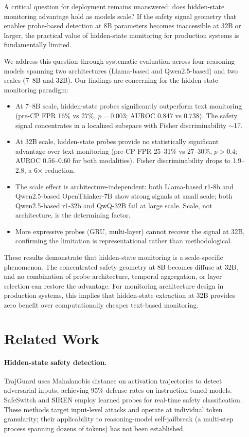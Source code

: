 \documentclass[11pt]{article}
\begin{document}
A critical question for deployment remains unanswered: does hidden-state monitoring advantage hold as models scale? If the safety signal geometry that enables probe-based detection at 8B parameters becomes inaccessible at 32B or larger, the practical value of hidden-state monitoring for production systems is fundamentally limited.

We address this question through systematic evaluation across four reasoning models spanning two architectures (Llama-based and Qwen2.5-based) and two scales (7--8B and 32B). Our findings are concerning for the hidden-state monitoring paradigm:

\begin{itemize}
\item At 7--8B scale, hidden-state probes significantly outperform text monitoring (pre-CP FPR 16\% vs 27\%, $p{=}0.003$; AUROC 0.847 vs 0.738). The safety signal concentrates in a localized subspace with Fisher discriminability $\sim$17.
\item At 32B scale, hidden-state probes provide no statistically significant advantage over text monitoring (pre-CP FPR 25--31\% vs 27--30\%, $p{>}0.4$; AUROC 0.56--0.60 for both modalities). Fisher discriminability drops to 1.9--2.8, a 6$\times$ reduction.
\item The scale effect is architecture-independent: both Llama-based r1-8b and Qwen2.5-based OpenThinker-7B show strong signals at small scale; both Qwen2.5-based r1-32b and QwQ-32B fail at large scale. Scale, not architecture, is the determining factor.
\item More expressive probes (GRU, multi-layer) cannot recover the signal at 32B, confirming the limitation is representational rather than methodological.
\end{itemize}

These results demonstrate that hidden-state monitoring is a scale-specific phenomenon. The concentrated safety geometry at 8B becomes diffuse at 32B, and no combination of probe architecture, temporal aggregation, or layer selection can restore the advantage. For monitoring architecture design in production systems, this implies that hidden-state extraction at 32B provides zero benefit over computationally cheaper text-based monitoring.

\section{Related Work}

\paragraph{Hidden-state safety detection.} TrajGuard uses Mahalanobis distance on activation trajectories to detect adversarial inputs, achieving 95\% defense rates on instruction-tuned models. SafeSwitch and SIREN employ learned probes for real-time safety classification. These methods target input-level attacks and operate at individual token granularity; their applicability to reasoning-model self-jailbreak (a multi-step process spanning dozens of tokens) has not been established.
\end{document}
